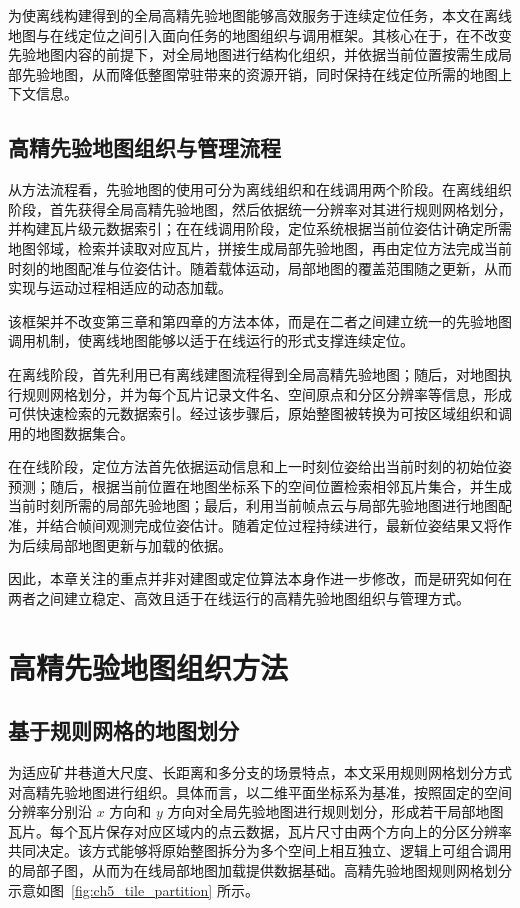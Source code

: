为使离线构建得到的全局高精先验地图能够高效服务于连续定位任务，本文在离线地图与在线定位之间引入面向任务的地图组织与调用框架。其核心在于，在不改变先验地图内容的前提下，对全局地图进行结构化组织，并依据当前位置按需生成局部先验地图，从而降低整图常驻带来的资源开销，同时保持在线定位所需的地图上下文信息。

\subsection{高精先验地图组织与管理流程}

从方法流程看，先验地图的使用可分为离线组织和在线调用两个阶段。在离线组织阶段，首先获得全局高精先验地图，然后依据统一分辨率对其进行规则网格划分，并构建瓦片级元数据索引；在在线调用阶段，定位系统根据当前位姿估计确定所需地图邻域，检索并读取对应瓦片，拼接生成局部先验地图，再由定位方法完成当前时刻的地图配准与位姿估计。随着载体运动，局部地图的覆盖范围随之更新，从而实现与运动过程相适应的动态加载。

该框架并不改变第三章和第四章的方法本体，而是在二者之间建立统一的先验地图调用机制，使离线地图能够以适于在线运行的形式支撑连续定位。

在离线阶段，首先利用已有离线建图流程得到全局高精先验地图；随后，对地图执行规则网格划分，并为每个瓦片记录文件名、空间原点和分区分辨率等信息，形成可供快速检索的元数据索引。经过该步骤后，原始整图被转换为可按区域组织和调用的地图数据集合。

在在线阶段，定位方法首先依据运动信息和上一时刻位姿给出当前时刻的初始位姿预测；随后，根据当前位置在地图坐标系下的空间位置检索相邻瓦片集合，并生成当前时刻所需的局部先验地图；最后，利用当前帧点云与局部先验地图进行地图配准，并结合帧间观测完成位姿估计。随着定位过程持续进行，最新位姿结果又将作为后续局部地图更新与加载的依据。

因此，本章关注的重点并非对建图或定位算法本身作进一步修改，而是研究如何在两者之间建立稳定、高效且适于在线运行的高精先验地图组织与管理方式。

\section{高精先验地图组织方法}

\subsection{基于规则网格的地图划分}

为适应矿井巷道大尺度、长距离和多分支的场景特点，本文采用规则网格划分方式对高精先验地图进行组织。具体而言，以二维平面坐标系为基准，按照固定的空间分辨率分别沿 $x$ 方向和 $y$ 方向对全局先验地图进行规则划分，形成若干局部地图瓦片。每个瓦片保存对应区域内的点云数据，瓦片尺寸由两个方向上的分区分辨率共同决定。该方式能够将原始整图拆分为多个空间上相互独立、逻辑上可组合调用的局部子图，从而为在线局部地图加载提供数据基础。高精先验地图规则网格划分示意如图~\ref{fig:ch5_tile_partition} 所示。

